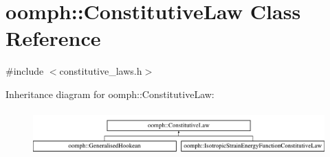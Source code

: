 \hypertarget{classoomph_1_1ConstitutiveLaw}{}\section{oomph\+:\+:Constitutive\+Law Class Reference}
\label{classoomph_1_1ConstitutiveLaw}


{\ttfamily \#include $<$constitutive\+\_\+laws.\+h$>$}

Inheritance diagram for oomph\+:\+:Constitutive\+Law\+:\begin{figure}[H]
\begin{center}
\leavevmode
\includegraphics[height=1.739130cm]{classoomph_1_1ConstitutiveLaw}
\end{center}
\end{figure}
